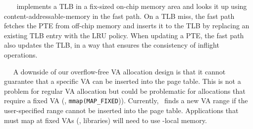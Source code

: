 ~~
\sys\ implements a TLB in a fix-sized on-chip memory area and looks it up using content-addressable-memory in the fast path.
On a TLB miss, the fast path fetches the PTE from off-chip memory and inserts it to the TLB by replacing an existing TLB entry with the LRU policy.
When updating a PTE, the fast path also updates the TLB, in a way that ensures the consistency of inflight operations.
%

~~
A downside of our overflow-free VA allocation design is that it cannot guarantee that a specific VA can be inserted into the page table. This is not a problem for regular VA allocation but could be problematic for allocations that require a fixed VA (\eg, \texttt{mmap(MAP\_FIXED})). 
Currently, \sys\ finds a new VA range if the user-specified range cannot be inserted into the page table. Applications that must map at fixed VAs (\eg, libraries) will need to use \CN-local memory.

